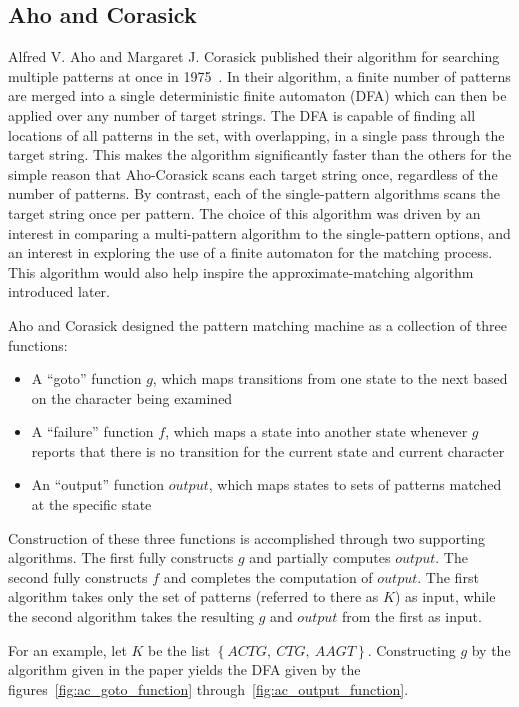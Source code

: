 \subsection{Aho and Corasick}

Alfred V. Aho and Margaret J. Corasick published their algorithm for searching multiple patterns at once in 1975~\cite{aho}. In their algorithm, a finite number of patterns are merged into a single deterministic finite automaton (DFA) which can then be applied over any number of target strings. The DFA is capable of finding all locations of all patterns in the set, with overlapping, in a single pass through the target string. This makes the algorithm significantly faster than the others for the simple reason that Aho-Corasick scans each target string once, regardless of the number of patterns. By contrast, each of the single-pattern algorithms scans the target string once per pattern. The choice of this algorithm was driven by an interest in comparing a multi-pattern algorithm to the single-pattern options, and an interest in exploring the use of a finite automaton for the matching process. This algorithm would also help inspire the approximate-matching algorithm introduced later.

Aho and Corasick designed the pattern matching machine as a collection of three functions:

\begin{itemize}
\item A ``goto'' function $g$, which maps transitions from one state to the next based on the character being examined
\item A ``failure'' function $f$, which maps a state into another state whenever $g$ reports that there is no transition for the current state and current character
\item An ``output'' function $output$, which maps states to sets of patterns matched at the specific state
\end{itemize}

Construction of these three functions is accomplished through two supporting algorithms. The first fully constructs $g$ and partially computes $output$. The second fully constructs $f$ and completes the computation of $output$. The first algorithm takes only the set of patterns (referred to there as $K$) as input, while the second algorithm takes the resulting $g$ and $output$ from the first as input.

For an example, let $K$ be the list $\left\lbrace ACTG,~CTG,~AAGT \right\rbrace$. Constructing $g$ by the algorithm given in the paper yields the DFA given by the figures~\ref{fig:ac_goto_function} through~\ref{fig:ac_output_function}.

